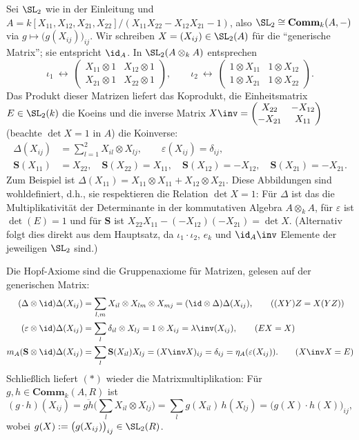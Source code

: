 \documentclass[11pt]{article}
\newcommand{\Comm}{\mathbf{Comm}}
\newcommand{\Sbold}{\mathbf{S}}
\begin{document}
\begin{example} \Theorem
    Sei $\SL_2$ wie in der Einleitung und $A = k[X_{11},X_{12},X_{21},X_{22}]/(X_{11}X_{22}-X_{12}X_{21}-1)$, also
    $\SL_2\cong\Comm_k(A,-)$ via $g\mapsto\big(g(X_{ij})\big)_{ij}$. Wir schreiben $X = (X_{ij})\in\SL_2(A)$ für die "`generische Matrix"';
    sie entspricht $\id_A$. In $\SL_2(A\otimes_k A)$ entsprechen
    $$\iota_1\ \leftrightarrow\ \begin{pmatrix} X_{11}\otimes 1 & X_{12}\otimes 1\\ X_{21}\otimes 1 & X_{22}\otimes 1\end{pmatrix},\qquad
      \iota_2\ \leftrightarrow\ \begin{pmatrix} 1\otimes X_{11} & 1\otimes X_{12}\\ 1\otimes X_{21} & 1\otimes X_{22}\end{pmatrix}.$$
    Das Produkt dieser Matrizen liefert das Koprodukt, die Einheitsmatrix $E\in\SL_2(k)$ die Koeins und die inverse Matrix
    $X\inv = \begin{pmatrix} X_{22} & -X_{12}\\ -X_{21} & X_{11}\end{pmatrix}$ (beachte $\det X = 1$ in $A$) die Koinverse:
    \begin{align*}
        \Delta(X_{ij}) &= \sum_{l=1}^2 X_{il}\otimes X_{lj}, \qquad \varepsilon(X_{ij}) = \delta_{ij},\\
        \Sbold(X_{11}) &= X_{22},\quad \Sbold(X_{22}) = X_{11},\quad \Sbold(X_{12}) = -X_{12},\quad \Sbold(X_{21}) = -X_{21}.
    \end{align*}
    Zum Beispiel ist $\Delta(X_{11}) = X_{11}\otimes X_{11} + X_{12}\otimes X_{21}$.
    Diese Abbildungen sind wohldefiniert, d.h., sie respektieren die Relation $\det X = 1$: Für $\Delta$ ist das die Multiplikativität der Determinante
    in der kommutativen Algebra $A\otimes_k A$, für $\varepsilon$ ist $\det(E) = 1$ und für $\Sbold$ ist $X_{22}X_{11}-(-X_{12})(-X_{21}) = \det X$.
    (Alternativ folgt dies direkt aus dem Hauptsatz, da $\iota_1\cdot\iota_2$, $e_k$ und $\id_A\inv$ Elemente der jeweiligen $\SL_2$ sind.)

    Die Hopf-Axiome sind die Gruppenaxiome für Matrizen, gelesen auf der generischen Matrix:
    \begin{align*}
        (\Delta\otimes\id)\Delta(X_{ij}) &= \sum_{l,m} X_{il}\otimes X_{lm}\otimes X_{mj} = (\id\otimes\Delta)\Delta(X_{ij}), \tag{$(XY)Z = X(YZ)$}\\
        (\varepsilon\otimes\id)\Delta(X_{ij}) &= \sum_l \delta_{il}\otimes X_{lj} = 1\otimes X_{ij} = \lambda\inv(X_{ij}), \tag{$E X = X$}\\
        m_A(\Sbold\otimes\id)\Delta(X_{ij}) &= \sum_l \Sbold(X_{il})X_{lj} = (X\inv X)_{ij} = \delta_{ij} = \eta_A(\varepsilon(X_{ij})). \tag{$X\inv X = E$}
    \end{align*}
    Schließlich liefert $(*)$ wieder die Matrixmultiplikation: Für $g,h\in\Comm_k(A,R)$ ist
    $$(g\cdot h)(X_{ij}) = \overline{gh}\Big(\sum_l X_{il}\otimes X_{lj}\Big) = \sum_l g(X_{il})\,h(X_{lj}) = \big(g(X)\cdot h(X)\big)_{ij},$$
    wobei $g(X) := \big(g(X_{ij})\big)_{ij}\in\SL_2(R)$.
\end{example}
\end{document}
